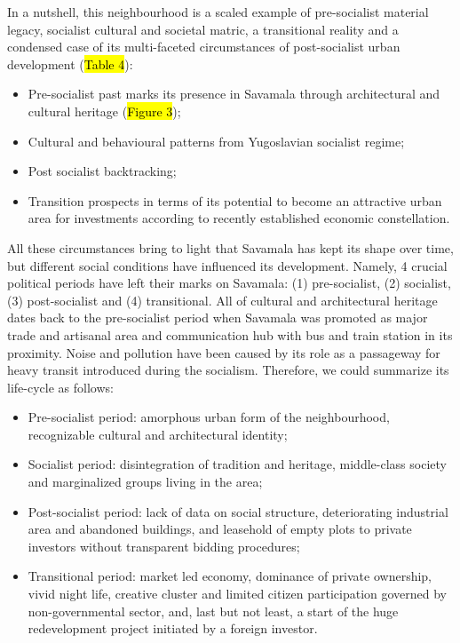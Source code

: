\documentclass[11pt]{report}
\begin{document}
In a nutshell, this neighbourhood is a scaled example of pre-socialist material legacy, socialist cultural and societal matric, a transitional reality and a condensed case of its multi-faceted circumstances of post-socialist urban development (\hl{Table 4}):
\begin{itemize}
\item Pre-socialist past marks its presence in Savamala through architectural and cultural heritage (\hl{Figure 3});
\item Cultural and behavioural patterns from Yugoslavian socialist regime;
\item Post socialist backtracking;
\item Transition prospects in terms of its potential to become an attractive urban area for investments according to recently established economic constellation.
\end{itemize}

All these circumstances bring to light that Savamala has kept its shape over time, but different social conditions have influenced its development.
Namely, 4 crucial political periods have left their marks on Savamala:
(1) pre-socialist,
(2) socialist,
(3) post-socialist
and (4) transitional. All of cultural and architectural heritage dates back to the pre-socialist period when Savamala was promoted as major trade and artisanal area and communication hub with bus and train station in its proximity. Noise and pollution have been caused by its role as a passageway for heavy transit introduced during the socialism. Therefore, we could summarize its life-cycle as follows:

\begin{itemize}
\item Pre-socialist period: amorphous urban form of the neighbourhood, recognizable cultural and architectural identity;

\item Socialist period: disintegration of tradition and heritage, middle-class society and marginalized groups living in the area;

\item Post-socialist period: lack of data on social structure, deteriorating industrial area and abandoned buildings, and leasehold of empty plots to private investors without transparent bidding procedures;

\item Transitional period: market led economy, dominance of private ownership, vivid night life, creative cluster and limited citizen participation governed by non-governmental sector, and, last but not least, a start of the huge redevelopment project initiated by a foreign  investor.
\end{itemize}
\end{document}
